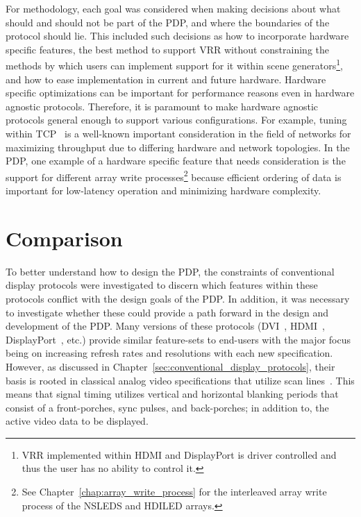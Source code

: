     For methodology, each goal was considered when making decisions about what should and should not be part of the PDP, and where the boundaries of the protocol should lie. This included such decisions as how to incorporate hardware specific features, the best method to support VRR without constraining the methods by which users can implement support for it within scene generators\footnote{VRR implemented within HDMI and DisplayPort is driver controlled and thus the user has no ability to control it.}, and how to ease implementation in current and future hardware. Hardware specific optimizations can be important for performance reasons even in hardware agnostic protocols. Therefore, it is paramount to make hardware agnostic protocols general enough to support various configurations. For example, tuning within TCP~\cite{WeigleFeng2002} is a well-known important consideration in the field of networks for maximizing throughput due to differing hardware and network topologies. In the PDP, one example of a hardware specific feature that needs consideration is the support for different array write processes\footnote{See Chapter~\ref{chap:array_write_process} for the interleaved array write process of the NSLEDS and HDILED arrays.} because efficient ordering of data is important for low-latency operation and minimizing hardware complexity.

\section{Comparison}

    To better understand how to design the PDP, the constraints of conventional display protocols were investigated to discern which features within these protocols conflict with the design goals of the PDP. In addition, it was necessary to investigate whether these could provide a path forward in the design and development of the PDP. Many versions of these protocols (DVI~\cite{DDWG1999}, HDMI~\cite{HDMIForum2018}, DisplayPort~\cite{VESA2016}, etc.) provide similar feature-sets to end-users with the major focus being on increasing refresh rates and resolutions with each new specification. However, as discussed in Chapter~\ref{sec:conventional_display_protocols}, their basis is rooted in classical analog video specifications that utilize scan lines~\cite{Neal1998}. This means that signal timing utilizes vertical and horizontal blanking periods that consist of a front-porches, sync pulses, and back-porches; in addition to, the active video data to be displayed.

